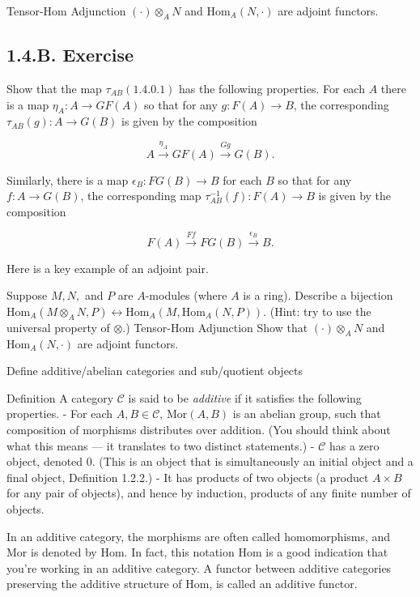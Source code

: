 Tensor-Hom Adjunction
\((\cdot) \otimes_A N\) and \(\mathrm{Hom}_A(N, \cdot)\) are adjoint functors.

\subsection*{1.4.B. Exercise}

Show that the map \(\tau_{AB} (1.4.0.1)\) has the following properties. For each \(A\) there is a map \(\eta_A: A \to GF(A)\) so that for any \(g: F(A) \to B\), the corresponding \(\tau_{AB}(g): A \to G(B)\) is given by the composition

\[
A \xrightarrow{\eta_A} GF(A) \xrightarrow{Gg} G(B).
\]

Similarly, there is a map \(\epsilon_B: FG(B) \to B\) for each \(B\) so that for any \(f: A \to G(B)\), the corresponding map \(\tau_{AB}^{-1}(f): F(A) \to B\) is given by the composition

\[
F(A) \xrightarrow{Ff} FG(B) \xrightarrow{\epsilon_B} B.
\]

Here is a key example of an adjoint pair.

Suppose \(M, N,\) and \(P\) are \(A\)-modules (where \(A\) is a ring). 
Describe a bijection \(\mathrm{Hom}_A(M \otimes_A N, P) \leftrightarrow \mathrm{Hom}_A(M, \mathrm{Hom}_A(N, P))\). 
(Hint: try to use the universal property of \(\otimes\).)
Tensor-Hom Adjunction
Show that \((\cdot) \otimes_A N\) and \(\mathrm{Hom}_A(N, \cdot)\) are adjoint functors.


Define additive/abelian categories and sub/quotient objects

Definition
A category \(\mathcal{C}\) is said to be \textit{additive} if it satisfies the following properties.
- For each \(A, B \in \mathcal{C}\), \(\mathrm{Mor}(A, B)\) is an abelian group, such that composition of morphisms distributes over addition. (You should think about what this means — it translates to two distinct statements.)
- \(\mathcal{C}\) has a zero object, denoted \(0\). (This is an object that is simultaneously an initial object and a final object, Definition 1.2.2.)
- It has products of two objects (a product \(A \times B\) for any pair of objects), and hence by induction, products of any finite number of objects.

In an additive category, the morphisms are often called homomorphisms, and \(\mathrm{Mor}\) is denoted by \(\mathrm{Hom}\). In fact, this notation \(\mathrm{Hom}\) is a good indication that you’re working in an additive category. A functor between additive categories preserving the additive structure of \(\mathrm{Hom}\), is called an additive functor.

